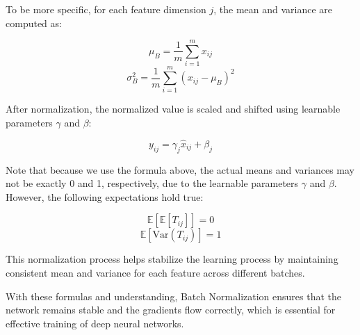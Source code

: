\documentclass[12pt]{article}
\begin{document}
To be more specific, for each feature dimension \( j \), the mean and variance are computed as:

\[ \mu_B = \frac{1}{m} \sum_{i=1}^m x_{ij} \]
\[ \sigma_B^2 = \frac{1}{m} \sum_{i=1}^m (x_{ij} - \mu_B)^2 \]

After normalization, the normalized value is scaled and shifted using learnable parameters \( \gamma \) and \( \beta \):

\[ y_{ij} = \gamma_j \hat{x}_{ij} + \beta_j \]

Note that because we use the formula above, the actual means and variances may not be exactly 0 and 1, respectively, due to the learnable parameters \( \gamma \) and \( \beta \). However, the following expectations hold true:

\[ \mathbb{E}[\mathbb{E}[T_{ij}]] = 0 \]
\[ \mathbb{E}[\text{Var}(T_{ij})] = 1 \]

This normalization process helps stabilize the learning process by maintaining consistent mean and variance for each feature across different batches.

With these formulas and understanding, Batch Normalization ensures that the network remains stable and the gradients flow correctly, which is essential for effective training of deep neural networks.
\end{document}
